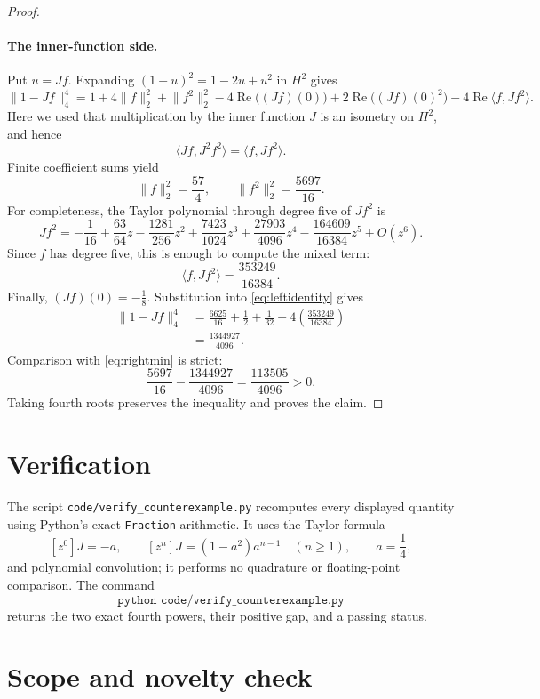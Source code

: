 \documentclass[11pt]{article}
\begin{document}
\begin{proof}
\paragraph{The inner-function side.}
Put \(u=Jf\).  Expanding \((1-u)^2=1-2u+u^2\) in \(H^2\) gives
\begin{equation}\label{eq:leftidentity}
\lVert1-Jf\rVert_4^4
=1+4\lVert f\rVert_2^2+\lVert f^2\rVert_2^2
-4\operatorname{Re}\bigl((Jf)(0)\bigr)
+2\operatorname{Re}\bigl((Jf)(0)^2\bigr)
-4\operatorname{Re}\langle f,Jf^2\rangle .
\end{equation}
Here we used that multiplication by the inner function \(J\) is an
isometry on \(H^2\), and hence
\[
\langle Jf,J^2f^2\rangle=\langle f,Jf^2\rangle.
\]
Finite coefficient sums yield
\[
 \lVert f\rVert_2^2=\frac{57}{4},
 \qquad
 \lVert f^2\rVert_2^2=\frac{5697}{16}.
\]
For completeness, the Taylor polynomial through degree five of \(Jf^2\) is
\[
 Jf^2=-\frac1{16}+\frac{63}{64}z-\frac{1281}{256}z^2
 +\frac{7423}{1024}z^3+\frac{27903}{4096}z^4
 -\frac{164609}{16384}z^5+O(z^6).
\]
Since \(f\) has degree five, this is enough to compute the mixed term:
\[
 \langle f,Jf^2\rangle
 =\frac{353249}{16384}.
\]
Finally, \((Jf)(0)=-\frac18\).  Substitution into
\eqref{eq:leftidentity} gives
\begin{align*}
\lVert1-Jf\rVert_4^4
&=\frac{6625}{16}+\frac12+\frac1{32}
  -4\left(\frac{353249}{16384}\right)\\
&=\frac{1344927}{4096}.
\end{align*}
Comparison with \eqref{eq:rightmin} is strict:
\[
 \frac{5697}{16}-\frac{1344927}{4096}
 =\frac{113505}{4096}>0.
\]
Taking fourth roots preserves the inequality and proves the claim.
\end{proof}

\section{Verification}

The script \texttt{code/verify\_counterexample.py} recomputes every displayed
quantity using Python's exact \texttt{Fraction} arithmetic.  It uses the
Taylor formula
\[
[z^0]J=-a,\qquad [z^n]J=(1-a^2)a^{n-1}\quad(n\ge1),
\qquad a=\frac14,
\]
and polynomial convolution; it performs no quadrature or floating-point
comparison.  The command
\[
\texttt{python code/verify\_counterexample.py}
\]
returns the two exact fourth powers, their positive gap, and a passing status.

\section{Scope and novelty check}
\end{document}
